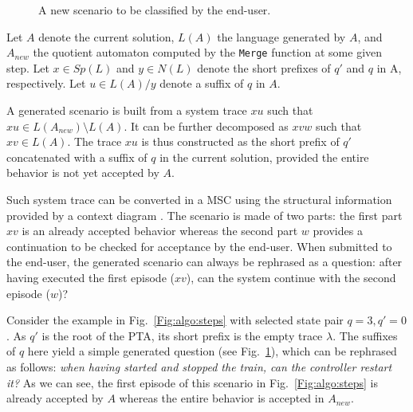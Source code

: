 \begin{description}
\begin{figure}
\centering
{}
\caption{A new scenario to be classified by the end-user\label{Fig:generated:question}.}
\end{figure}

Let $A$ denote the current solution, $L(A)$ the language generated by $A$, and $A_{new}$ the quotient automaton computed by the \texttt{Merge} function at some given step. Let $x \in Sp(L)$ and $y \in N(L)$ denote the short prefixes of $q'$ and $q$ in A, respectively. Let $u \in L(A)/y$ denote a suffix of $q$ in $A$. 

A generated scenario is built from a system trace $xu$ such that $xu \in L(A_{new})\setminus L(A)$. It can be further decomposed as $xvw$ such that $xv \in L(A)$. The trace $xu$ is thus constructed as the short prefix of $q'$ concatenated with a suffix of $q$ in the current solution, provided the entire behavior is not yet accepted by $A$. 

Such system trace can be converted in a MSC using the structural information provided by a context diagram \cite{Jackson:1995}. The scenario is made of two parts: the first part $xv$ is an already accepted behavior whereas the second part $w$ provides a continuation to be checked for acceptance by the end-user. When submitted to the end-user, the generated scenario can always be rephrased as a question: after having executed the first episode ($xv$), can the system continue with the second episode ($w$)? 

Consider the example in Fig.~\ref{Fig:algo:steps} with selected state pair $q=3, q'=0$. As $q'$ is the root of the PTA, its short prefix is the empty trace $\lambda$. The suffixes of $q$ here yield a simple generated question (see Fig.~\ref{Fig:generated:question}), which can be rephrased as follows: \emph{when having started and stopped the train, can the controller restart it?} As we can see, the first episode of this scenario in Fig.~\ref{Fig:algo:steps} is already accepted by $A$ whereas the entire behavior is accepted in $A_{new}$.


\end{description}
